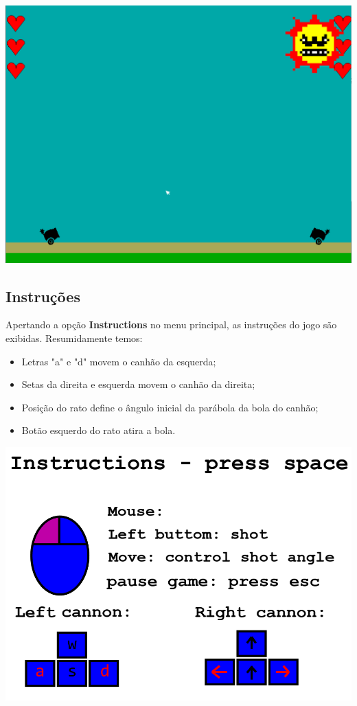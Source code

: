 \documentclass[12pt]{article}
\begin{document}
\begin{center}
    \includegraphics[width = 14cm]{Game.png}
\end{center}

\newpage
\subsection{Instruções}
Apertando a opção \textbf{Instructions} no menu principal, as instruções do jogo são exibidas.
Resumidamente temos: 
\begin{itemize}
    \item Letras "a" e "d" movem o canhão da esquerda;
    \item Setas da direita e esquerda movem o canhão da direita; 
    \item Posição do rato define o ângulo inicial da parábola da bola do canhão;
    \item Botão esquerdo do rato atira a bola.
\end{itemize} 
\begin{center}
    \includegraphics[width = 14cm]{Instructions.png}
\end{center}
\newpage
\end{document}
